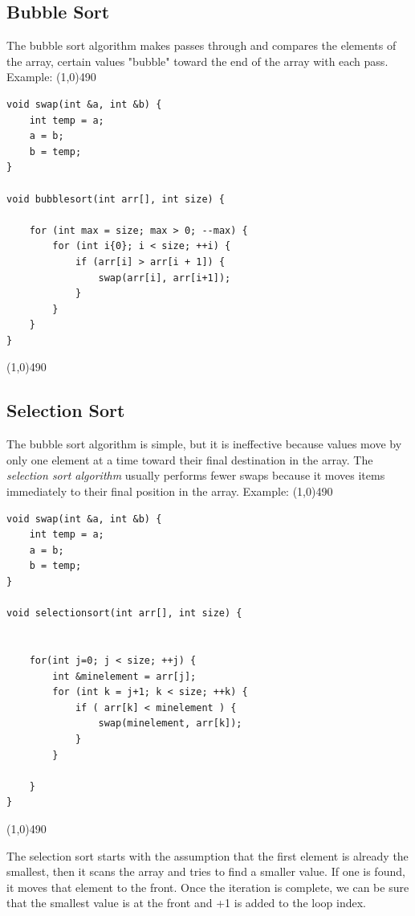\documentclass{report}
\begin{document}
    \pagebreak \bigbreak \noindent 
    \subsection{Bubble Sort}
    \bigbreak \noindent 
    The bubble sort algorithm makes passes through and compares the elements of the array, certain values "bubble" toward the end of the array with each pass.
    \bigbreak \noindent 
    Example:
    \bigbreak \noindent 
    \line(1,0){490}
    \begin{verbatim}
void swap(int &a, int &b) {
    int temp = a;
    a = b;
    b = temp;
}

void bubblesort(int arr[], int size) {

    for (int max = size; max > 0; --max) {
        for (int i{0}; i < size; ++i) {
            if (arr[i] > arr[i + 1]) {
                swap(arr[i], arr[i+1]);
            }
        }
    } 
}
    \end{verbatim}
    \line(1,0){490}

    \bigbreak \noindent 
    \subsection{Selection Sort}
    \bigbreak \noindent 
    The bubble sort algorithm is simple, but it is ineffective because values move by only one element at a time toward their final destination in the array. The \textit{selection sort algorithm} usually performs fewer swaps because it moves items immediately to their final position in the array. 
    \bigbreak \noindent 
    Example:
    \bigbreak \noindent 
    \line(1,0){490}
    \begin{verbatim}
void swap(int &a, int &b) {
    int temp = a;
    a = b;
    b = temp;
}

void selectionsort(int arr[], int size) {


    for(int j=0; j < size; ++j) {
        int &minelement = arr[j];
        for (int k = j+1; k < size; ++k) {
            if ( arr[k] < minelement ) {
                swap(minelement, arr[k]);
            }
        }

    }
}
    \end{verbatim}
    \line(1,0){490}

    \pagebreak \bigbreak \noindent 
    The selection sort starts with the assumption that the first element is already the smallest, then it scans the array and tries to find a smaller value. If one is found, it moves that element to the front. Once the iteration is complete, we can be sure that the smallest value is at the front and +1 is added to the loop index.
\end{document}
